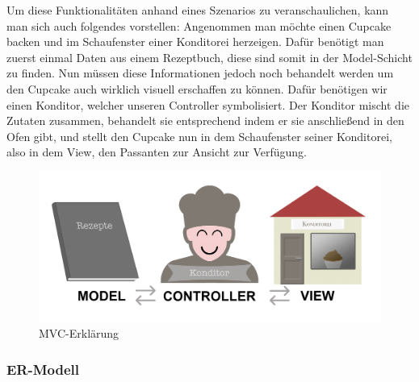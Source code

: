 Um diese Funktionalitäten anhand eines Szenarios zu veranschaulichen, kann man sich auch folgendes vorstellen:
Angenommen man möchte einen Cupcake backen und im Schaufenster einer Konditorei herzeigen. Dafür benötigt man zuerst einmal Daten aus einem Rezeptbuch, diese sind somit in der Model-Schicht zu finden.
Nun müssen diese Informationen jedoch noch behandelt werden um den Cupcake auch wirklich visuell erschaffen zu können. Dafür benötigen wir einen Konditor, welcher unseren Controller symbolisiert.
Der Konditor mischt die Zutaten zusammen, behandelt sie entsprechend indem er sie anschließend in den Ofen gibt, und stellt den Cupcake nun in dem Schaufenster seiner Konditorei, also in dem View, den Passanten zur Ansicht zur Verfügung.
			\begin{figure}[H]
			\begin{centering}
			\includegraphics[width = 1\textwidth]{Bilder/Jok_mvc.png}
			\par\end{centering}
			\caption{MVC-Erklärung}
			\label{MVC-Erklärung}
			\end{figure}

    \subsubsection{ER-Modell}

